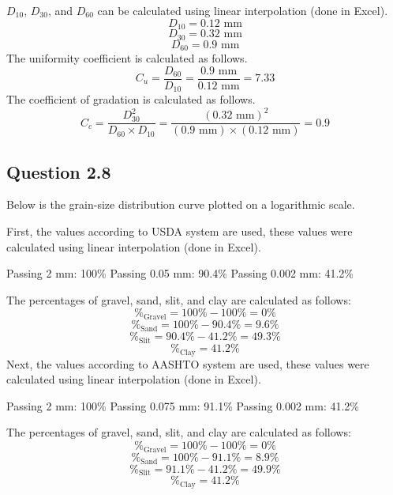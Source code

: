 \documentclass{article}
\begin{document}
\(D_{10}\), \(D_{30}\), and \(D_{60}\) can be calculated using linear interpolation (done in Excel).
\[D_{10}=\boxed{0.12\text{ mm}}\]
\[D_{30}=\boxed{0.32\text{ mm}}\] 
\[D_{60}=\boxed{0.9\text{ mm}}\] 
The uniformity coefficient is calculated as follows.
\[C_u=\frac{D_{60}}{D_{10}}=\frac{0.9\text{ mm}}{0.12\text{ mm}}=\boxed{7.33}\]
The coefficient of gradation is calculated as follows.
\[C_c=\frac{D_{30}^2}{D_{60}\times D_{10}}=\frac{(0.32\text{ mm})^2}{(0.9\text{ mm})\times (0.12\text{ mm})}=\boxed{0.9}\]
\subsection*{Question 2.8}
Below is the grain-size distribution curve plotted on a logarithmic scale.
\begin{center}
    \pgfplotsset{width=10cm}
\end{center}
First, the values according to USDA system are used, these values were calculated using linear interpolation (done in Excel).
\begin{center}
    Passing 2 mm: 100\% \hspace{3mm} Passing 0.05 mm: 90.4\% \hspace{3mm} Passing 0.002 mm: 41.2\%
\end{center}
The percentages of gravel, sand, slit, and clay are calculated as follows:
\[\%_\text{Gravel}=100\%-100\%=\boxed{0\%}\] 
\[\%_\text{Sand}=100\%-90.4\%=\boxed{9.6\%}\] 
\[\%_\text{Slit}=90.4\%-41.2\%=\boxed{49.3\%}\] 
\[\%_\text{Clay}=\boxed{41.2\%}\] 
Next, the values according to AASHTO system are used, these values were calculated using linear interpolation (done in Excel).
\begin{center}
    Passing 2 mm: 100\% \hspace{3mm} Passing 0.075 mm: 91.1\% \hspace{3mm} Passing 0.002 mm: 41.2\%
\end{center}
The percentages of gravel, sand, slit, and clay are calculated as follows:
\[\%_\text{Gravel}=100\%-100\%=\boxed{0\%}\] 
\[\%_\text{Sand}=100\%-91.1\%=\boxed{8.9\%}\] 
\[\%_\text{Slit}=91.1\%-41.2\%=\boxed{49.9\%}\] 
\[\%_\text{Clay}=\boxed{41.2\%}\] 
\newpage
\end{document}
